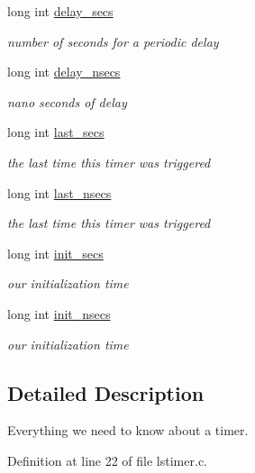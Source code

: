 \begin{DoxyCompactItemize}
long int \hyperlink{structlstimer__list__struct_aa5eac664fe8159916bc3cdfbf583f818}{delay\-\_\-secs}
\begin{DoxyCompactList}\small\item\em number of seconds for a periodic delay \end{DoxyCompactList}\item 
long int \hyperlink{structlstimer__list__struct_a45e9fc0b669a1b2831d46b465822344c}{delay\-\_\-nsecs}
\begin{DoxyCompactList}\small\item\em nano seconds of delay \end{DoxyCompactList}\item 
long int \hyperlink{structlstimer__list__struct_a8f881e66431efbed84b6ad029757bc67}{last\-\_\-secs}
\begin{DoxyCompactList}\small\item\em the last time this timer was triggered \end{DoxyCompactList}\item 
long int \hyperlink{structlstimer__list__struct_a0b2ab04246481397116ac9770c3c6603}{last\-\_\-nsecs}
\begin{DoxyCompactList}\small\item\em the last time this timer was triggered \end{DoxyCompactList}\item 
long int \hyperlink{structlstimer__list__struct_a9633d830ecdce7852530079bb09a6d3c}{init\-\_\-secs}
\begin{DoxyCompactList}\small\item\em our initialization time \end{DoxyCompactList}\item 
long int \hyperlink{structlstimer__list__struct_a72665e0a227b5ee0c82aee43dfaf440a}{init\-\_\-nsecs}
\begin{DoxyCompactList}\small\item\em our initialization time \end{DoxyCompactList}\end{DoxyCompactItemize}


\subsection{Detailed Description}
Everything we need to know about a timer. 

Definition at line 22 of file lstimer.\-c.



